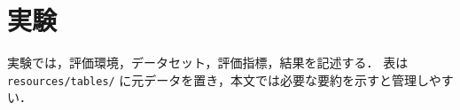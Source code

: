 \section{実験}

実験では，評価環境，データセット，評価指標，結果を記述する．
表は \texttt{resources/tables/} に元データを置き，本文では必要な要約を示すと管理しやすい．
